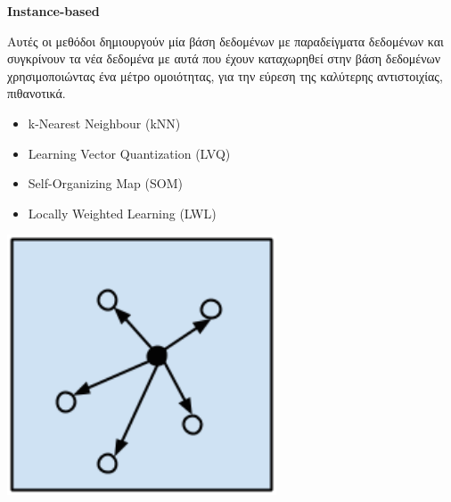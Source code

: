 \begin{minipage}{0.5\textwidth}

\textbf{\large Instance-based}

  Αυτές οι μεθόδοι δημιουργούν μία βάση δεδομένων με
  παραδείγματα δεδομένων και συγκρίνουν τα νέα δεδομένα με αυτά που έχουν
  καταχωρηθεί στην βάση δεδομένων χρησιμοποιώντας ένα μέτρο ομοιότητας,
  για την εύρεση της καλύτερης αντιστοιχίας, πιθανοτικά.
  \begin{itemize}
    \setlength\itemsep{0em}
    \item{k-Nearest Neighbour (kNN)}
    \item{Learning Vector Quantization (LVQ)}
    \item{Self-Organizing Map (SOM)}
    \item{Locally Weighted Learning (LWL)}
  \end{itemize}
\end{minipage}
\begin{minipage}{0.5\textwidth}
  \begin{center}
    \includegraphics[width=0.6\textwidth]{./images/chapter3/instance_based_algorithms.png}
  \end{center}
\end{minipage}


